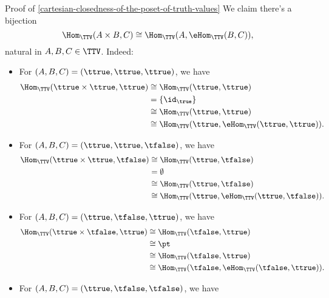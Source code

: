 \begin{Proof}{Proof of \cref{cartesian-closedness-of-the-poset-of-truth-values}}
    We claim there's a bijection
    \[
        \Hom_{\TTV}(A\times B,C)%
        \cong%
        \Hom_{\TTV}(A,\eHom_{\TTV}(B,C)),%
    \]%
    natural in $A,B,C\in\TTV$. Indeed:
    \begin{itemize}
        \item For $(A,B,C)=(\ttrue,\ttrue,\ttrue)$, we have
            \begin{align*}
                \Hom_{\TTV}(\ttrue\times\ttrue,\ttrue)    &\cong \Hom_{\TTV}(\ttrue,\ttrue)\\
                                                          &=     \{\id_{\true}\}\\
                                                          &\cong \Hom_{\TTV}(\ttrue,\ttrue)\\
                                                          &\cong \Hom_{\TTV}(\ttrue,\eHom_{\TTV}(\ttrue,\ttrue)).
            \end{align*}
        \item For $(A,B,C)=(\ttrue,\ttrue,\tfalse)$, we have
            \begin{align*}
                \Hom_{\TTV}(\ttrue\times\ttrue,\tfalse)   &\cong \Hom_{\TTV}(\ttrue,\tfalse)\\
                                                          &=     \emptyset\\
                                                          &\cong \Hom_{\TTV}(\ttrue,\tfalse)\\
                                                          &\cong \Hom_{\TTV}(\ttrue,\eHom_{\TTV}(\ttrue,\tfalse)).
            \end{align*}
        \item For $(A,B,C)=(\ttrue,\tfalse,\ttrue)$, we have
            \begin{align*}
                \Hom_{\TTV}(\ttrue\times\tfalse,\ttrue)   &\cong \Hom_{\TTV}(\tfalse,\ttrue)\\
                                                          &\cong \pt\\
                                                          &\cong \Hom_{\TTV}(\tfalse,\ttrue)\\
                                                          &\cong \Hom_{\TTV}(\tfalse,\eHom_{\TTV}(\tfalse,\ttrue)).
            \end{align*}
        \item For $(A,B,C)=(\ttrue,\tfalse,\tfalse)$, we have
            \begin{align*}

\end{align*}
\end{itemize}
\end{Proof}
